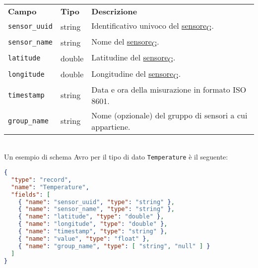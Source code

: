 \begin{table}[ht]
	\begin{tabular}{lll}
		\textbf{Campo}        & \textbf{Tipo} & \textbf{Descrizione}                                     \\
		\texttt{sensor\_uuid} & string        & Identificativo univoco del \href{https://7last.github.io/docs/pb/documentazione-interna/glossario\#sensore}{sensore\textsubscript{G}}.                      \\
		\texttt{sensor\_name} & string        & Nome del \href{https://7last.github.io/docs/pb/documentazione-interna/glossario\#sensore}{sensore\textsubscript{G}}.                                        \\
		\texttt{latitude}     & double        & Latitudine del \href{https://7last.github.io/docs/pb/documentazione-interna/glossario\#sensore}{sensore\textsubscript{G}}.                                  \\
		\texttt{longitude}    & double        & Longitudine del \href{https://7last.github.io/docs/pb/documentazione-interna/glossario\#sensore}{sensore\textsubscript{G}}.                                 \\
		\texttt{timestamp}    & string        & Data e ora della misurazione in formato ISO 8601.        \\
		\texttt{group\_name}  & string        & Nome (opzionale) del gruppo di sensori a cui appartiene. \\
	\end{tabular}
\end{table}
\\
Un esempio di schema Avro per il tipo di dato \texttt{Temperature} è il seguente:
\begin{lstlisting}[language=json, caption=Esempio di schema Avro per il tipo di dato \texttt{Temperature},captionpos=b]
{
  "type": "record",
  "name": "Temperature",
  "fields": [
    { "name": "sensor_uuid", "type": "string" },
    { "name": "sensor_name", "type": "string" },
    { "name": "latitude", "type": "double" },
    { "name": "longitude", "type": "double" },
    { "name": "timestamp", "type": "string" },
    { "name": "value", "type": "float" },
    { "name": "group_name", "type": [ "string", "null" ] }
  ]
}
\end{lstlisting}

